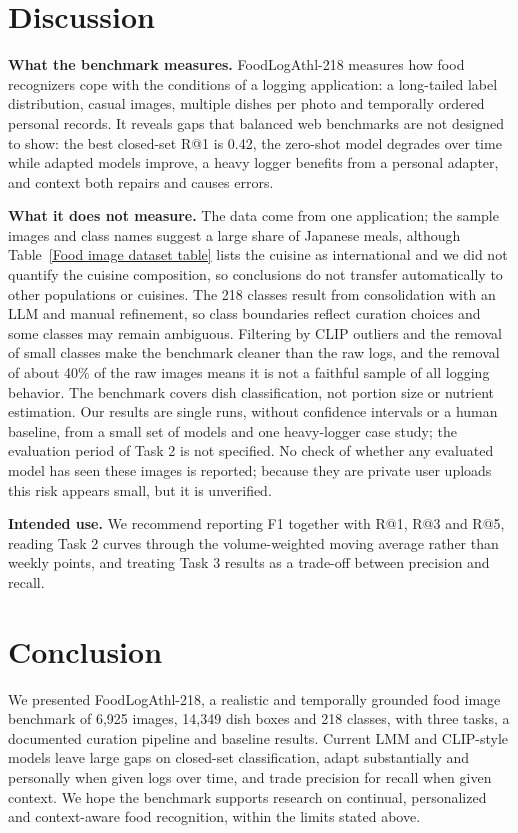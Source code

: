 \documentclass[sigconf, nonacm]{acmart}
\begin{document}
\section{Discussion}

\textbf{What the benchmark measures.} FoodLogAthl-218 measures how food recognizers cope with the conditions of a logging application: a long-tailed label distribution, casual images, multiple dishes per photo and temporally ordered personal records. It reveals gaps that balanced web benchmarks are not designed to show: the best closed-set R@1 is 0.42, the zero-shot model degrades over time while adapted models improve, a heavy logger benefits from a personal adapter, and context both repairs and causes errors.

\textbf{What it does not measure.} The data come from one application; the sample images and class names suggest a large share of Japanese meals, although Table~\ref{Food image dataset table} lists the cuisine as international and we did not quantify the cuisine composition, so conclusions do not transfer automatically to other populations or cuisines. The 218 classes result from consolidation with an LLM and manual refinement, so class boundaries reflect curation choices and some classes may remain ambiguous. Filtering by CLIP outliers and the removal of small classes make the benchmark cleaner than the raw logs, and the removal of about 40\% of the raw images means it is not a faithful sample of all logging behavior. The benchmark covers dish classification, not portion size or nutrient estimation. Our results are single runs, without confidence intervals or a human baseline, from a small set of models and one heavy-logger case study; the evaluation period of Task 2 is not specified. No check of whether any evaluated model has seen these images is reported; because they are private user uploads this risk appears small, but it is unverified.

\textbf{Intended use.} We recommend reporting F1 together with R@1, R@3 and R@5, reading Task 2 curves through the volume-weighted moving average rather than weekly points, and treating Task 3 results as a trade-off between precision and recall.

\section{Conclusion}

We presented FoodLogAthl-218, a realistic and temporally grounded food image benchmark of 6,925 images, 14,349 dish boxes and 218 classes, with three tasks, a documented curation pipeline and baseline results. Current LMM and CLIP-style models leave large gaps on closed-set classification, adapt substantially and personally when given logs over time, and trade precision for recall when given context. We hope the benchmark supports research on continual, personalized and context-aware food recognition, within the limits stated above.




\end{document}
